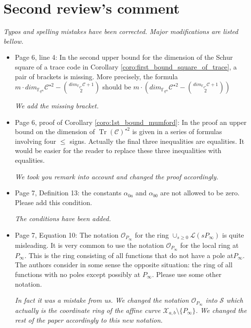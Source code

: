 \documentclass[12pt,a4paper]{amsart}
\DeclareMathOperator{\trace}{Tr}
\newcommand{\fqm}{\mathbb{F}_{q^m}}
\newcommand{\calC}{\mathcal{C}}
\newcommand{\calX}{\mathcal{X}}
\newcommand{\Tr}[1]{\trace\!\left(#1\right)}
\begin{document}
\section*{Second review's comment}

\textit{Typos and spelling mistakes have been corrected. Major modifications are listed bellow.} \\

\begin{itemize}

\item Page 6, line 4: In the second upper bound for the dimension of the Schur square of a trace code in Corollary \ref{coro:first_bound_square_of_trace}, a pair of brackets is missing. More precisely, the formula $m \cdot dim_{\fqm} \calC^{\star 2}-\binom{dim_{\fqm}\calC+1}{2}$ should be $m \cdot \left( dim_{\fqm} \calC^{\star 2} -\binom{dim_{\fqm} \calC+1}{2}\right)$

\textit{We add the missing bracket.}

\item Page 6, proof of Corollary \ref{coro:1st_bound_mumford}: In the proof an upper bound on the dimension of $\Tr{\calC}^{\star 2}$ is given in a series of formulas involving four $\le$ signs. Actually the final three inequalities are equalities. It would be easier for the reader to replace these three inequalities with equalities.

\textit{We took you remark into account and changed the proof accordingly.}


\item Page 7, Definition 13: the constants $\alpha_{0a}$ and $\alpha_{b0}$ are not allowed to be zero. Please add this condition.

\textit{The conditions have been added.} 

\item Page 7, Equation 10: The notation $\mathcal{O}_{P_\infty}$ for the ring $\cup_{s \ge 0} \mathcal{L}(sP_\infty)$ is quite misleading. It is very common to use the notation $\mathcal{O}_{P_\infty}$ for the local ring at $P_\infty$. This is the ring consisting of all functions that do not have a pole at$ P_\infty$. The authors consider in some sense the opposite situation: the ring of all functions with no poles except possibly at $P_\infty$. Please use some other notation.

\textit{In fact it was a mistake from us. We changed the notation $\mathcal{O}_{P_\infty}$ into $\mathcal{S}$ which actually is the coordinate ring of the affine curve $\calX_{a,b} \setminus \{P_\infty\}$. We changed the rest of the paper accordingly to this new notation.}


\end{itemize}
\end{document}

